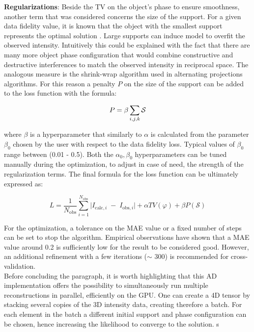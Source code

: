 \textbf{Regularizations}:
Beside the TV on the object's phase to ensure smoothness, another term that was considered concerns the size of the support. 
For a given data fidelity value, it is known that the object with the smallest support represents the optimal solution 
\cite{favre-nicolin_free_2020}. Large supports can induce model to overfit the observed intensity. Intuitively this 
could be explained with the fact that there are many more object phase configuration 
that would combine constructive and destructive interferences to match the observed intensity in reciprocal space. 
The analogous measure is the shrink-wrap algorithm \cite{Marchesini_shrinkwrap} used in alternating projections algorithms.  
For this reason a penalty $P$ on the size of the support can be added to the loss function with the formula: 

\begin{equation}
    \centering
    P = \beta  \sum_{i,j,k} \mathcal S
\end{equation}

where $\beta$ is a hyperparameter that similarly to $\alpha$ is calculated from the parameter $\beta_0$ chosen by the 
user with respect to the data fidelity loss. Typical values of $\beta_0$ range between (0.01 - 0.5).
Both the $\alpha_0, \beta_0$ hyperparameters can be tuned manually during the optimization, to adjust in case of need, the strength of 
the regularization terms.
The final formula for the loss function can be ultimately expressed as: 

\begin{equation}
       L = \frac{1}{N_{\mathrm{obs}}}
       \sum_{i=1}^{N_{\mathrm{obs}}}
       \bigl\lvert I_{\mathrm{calc},i} \;-\; I_{\mathrm{obs},i}\bigr\rvert  
        + \alpha TV(\varphi)
        + \beta  P(\mathcal S)
\end{equation}

For the optimization, a tolerance on the MAE value or a fixed number of steps can be set to stop the algorithm. Empirical 
observations have shown that a MAE value around 0.2 is sufficiently low for the result to be considered good. However, 
an additional refinement with a few iterations ($\sim$ 300) is recommended for cross-validation.  \\

Before concluding the paragraph, it is worth highlighting that this AD implementation offers the possibility to simultaneously 
run multiple reconstructions in parallel, efficiently on the GPU. One can create a 4D tensor by stacking several copies of the 3D 
intensity data, creating therefore a batch. For each element in the batch a different initial support and phase configuration 
can be chosen, hence increasing the likelihood to converge to the solution. 
s
